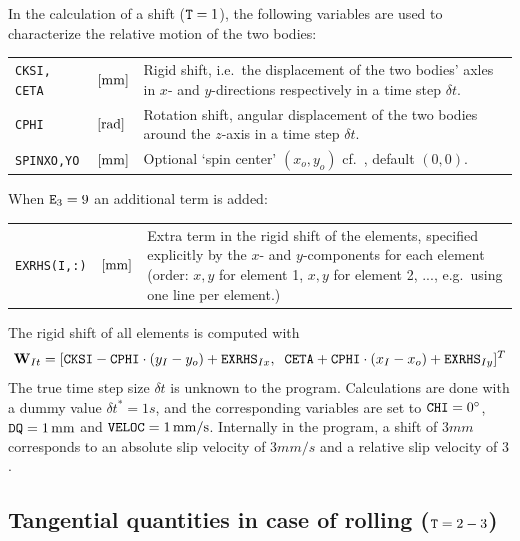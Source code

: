 \documentclass[12pt]{report}
\newenvironment{inputvars}{\vspace{0.4\baselineskip}%

\begin{tabular}{>{\raggedright}p{22mm}p{19mm}p{113mm}}}{
\end{tabular}

}
\newcommand{\inpvar}[3]{{\small\tt #1} & $#2$ & #3 \\[1ex]}
\begin{document}
In the calculation of a shift (${\tt T}=1$), the following variables are used
to characterize the relative motion of the two bodies:
\begin{inputvars}
\inpvar{CKSI, CETA}{\bunit{mm}}{Rigid shift, i.e.\ the displacement of the two
        bodies' axles in $x$- and $y$-directions respectively in a time
        step $\delta t$.}
\inpvar{CPHI}{\bunit{rad}}{Rotation shift, angular displacement of the two
        bodies around the $z$-axis in a time step $\delta t$.}
\inpvar{SPINXO,YO}{\bunit{mm}}{Optional `spin center' $(x_o,y_o)$ cf.\
        \cite{Vollebregt2018a-sdec}, default $(0,0)$.}
\end{inputvars}
When ${\tt E}_3=9$ an additional term is added:
\begin{inputvars}
\inpvar{EXRHS(I,:)}{\bunit{mm}}{Extra term in the rigid shift of the elements,
        specified explicitly by the $x$- and $y$-components for each
        element (order: $x,y$ for element 1, $x,y$ for element 2, ...,
        e.g.\ using one line per element.)}
\end{inputvars}
The rigid shift of all elements is computed with
\begin{equation}
    \vec{W}_{It} = [{\tt CKSI} - {\tt CPHI} \cdot (y_I-y_o) + 
                                                {\tt EXRHS}_{Ix},  \;\;
     {\tt CETA} + {\tt CPHI} \cdot (x_I-x_o) + {\tt EXRHS}_{Iy}  ]^T
\end{equation}
The true time step size $\delta t$ is unknown to the program. Calculations
are done with a dummy value $\delta t^*=1\unit{s}$, and the corresponding
variables are set to ${\tt CHI}=0^\circ$, ${\tt DQ}=1\unit{mm}$ and
${\tt VELOC}=1\unit{mm/s}$. Internally in the program, a shift of $3\unit{mm}$
corresponds to an absolute slip velocity of $3\unit{mm/s}$ and a relative
slip velocity of $3$.

\subsection{\texorpdfstring{Tangential quantities in case of rolling (${\tt
        T}=2-3$)}{Tangential quantities in case of rolling (T=2--3)}}
\label{sec:kincns_roll}
\end{document}
